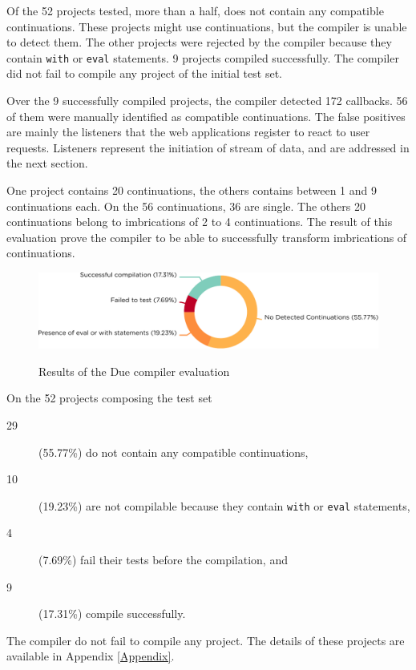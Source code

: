 Of the \num{52} projects tested, more than a half, does not contain any compatible continuations.
These projects might use continuations, but the compiler is unable to detect them.
The other projects were rejected by the compiler because they contain \texttt{with} or \texttt{eval} statements. %
\num{9} projects compiled successfully.
The compiler did not fail to compile any project of the initial test set.

Over the \num{9} successfully compiled projects, the compiler detected \num{172} callbacks.
56 of them were manually identified as compatible continuations.
The false positives are mainly the listeners that the web applications register to react to user requests.
Listeners represent the initiation of stream of data, and are addressed in the next section.

One project contains \num{20} continuations, the others contains between \num{1} and \num{9} continuations each.
On the \num{56} continuations, \num{36} are single. %
The others \num{20} continuations belong to imbrications of 2 to 4 continuations.
The result of this evaluation prove the compiler to be able to successfully transform imbrications of continuations.

\begin{figure}[h!]
  \centering
  \includegraphics[width=\linewidth]{../resources/due-evaluation.pdf}
  \label{fig:due-evaluation}
  \caption{Results of the Due compiler evaluation}
\end{figure}

On the \num{52} projects composing the test set
\begin{description}
\item[29] (55.77\%) do not contain any compatible continuations,
\item[10] (19.23\%) are not compilable because they contain \texttt{with} or \texttt{eval} statements,
\item[4] (7.69\%) fail their tests before the compilation, and
\item[9] (17.31\%) compile successfully.
\end{description}
The compiler do not fail to compile any project.
The details of these projects are available in Appendix \ref{Appendix}.

